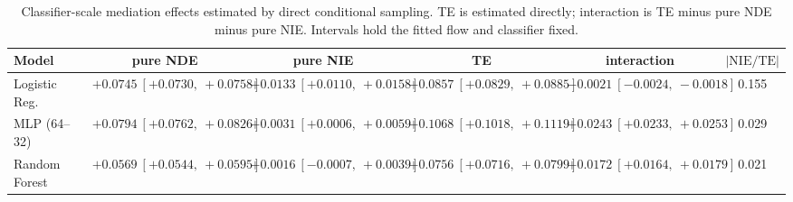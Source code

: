 \begin{table}[htbp]
  \centering
  \caption{Classifier-scale mediation effects estimated by direct conditional sampling. TE is estimated directly; interaction is TE minus pure NDE minus pure NIE. Intervals hold the fitted flow and classifier fixed.}
  \label{tab:acs_gap_overall}
  \begin{tabular}{lccccc}
    \toprule
    Model & pure NDE & pure NIE & TE & interaction & $|\mathrm{NIE}/\mathrm{TE}|$ \\
    \midrule
    Logistic Reg. & $+0.0745\ [+0.0730,\ +0.0758]$ & $+0.0133\ [+0.0110,\ +0.0158]$ & $+0.0857\ [+0.0829,\ +0.0885]$ & $-0.0021\ [-0.0024,\ -0.0018]$ & 0.155 \\
    MLP (64--32) & $+0.0794\ [+0.0762,\ +0.0826]$ & $+0.0031\ [+0.0006,\ +0.0059]$ & $+0.1068\ [+0.1018,\ +0.1119]$ & $+0.0243\ [+0.0233,\ +0.0253]$ & 0.029 \\
    Random Forest & $+0.0569\ [+0.0544,\ +0.0595]$ & $+0.0016\ [-0.0007,\ +0.0039]$ & $+0.0756\ [+0.0716,\ +0.0799]$ & $+0.0172\ [+0.0164,\ +0.0179]$ & 0.021 \\
    \bottomrule
  \end{tabular}
\end{table}